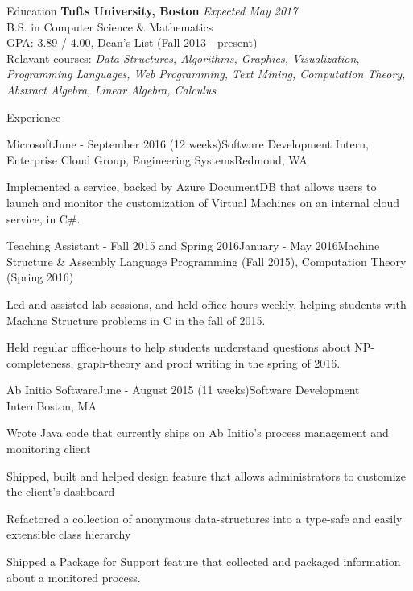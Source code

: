 \documentclass{resume}
\begin{document}
  \begin{rSection}{Education}
    {\bf Tufts University, Boston} \hfill {\em Expected May 2017} \\ 
    { B.S. in Computer Science \& Mathematics } \\
    GPA: 3.89 / 4.00, Dean's List (Fall 2013 - present)\\
    Relavant courses: 
    \textit{Data Structures, Algorithms, Graphics, Visualization, Programming Languages, Web Programming, Text Mining, Computation Theory, Abstract Algebra, Linear Algebra, Calculus}
  \end{rSection}
  
  \begin{rSection}{Experience}
  
    \begin{rSubsection}{Microsoft}{June - September 2016 (12 weeks)}{Software Development Intern, Enterprise Cloud Group, Engineering Systems}{Redmond, WA}
    \item Implemented a service, backed by Azure DocumentDB that allows users to launch and monitor the customization of Virtual Machines on an internal cloud service, in C\#.
    \end{rSubsection}

    \begin{rSubsection}{Teaching Assistant - Fall 2015 and Spring 2016}{January - May 2016}{Machine Structure \& Assembly Language Programming (Fall 2015), Computation Theory (Spring 2016)}{}
    \item Led and assisted lab sessions, and held office-hours weekly, helping students with Machine Structure problems in C in the fall of 2015.
    \item Held regular office-hours to help students understand questions about NP-completeness, graph-theory and proof writing in the spring of 2016.
    \end{rSubsection}
  
    \begin{rSubsection}{Ab Initio Software}{June - August 2015 (11 weeks)}{Software Development Intern}{Boston, MA}
    \item Wrote Java code that currently ships on Ab Initio's process management and monitoring client
    \item Shipped, built and helped design feature that allows administrators to customize the client’s dashboard
    \item Refactored a collection of anonymous data-structures into a type-safe and easily extensible class hierarchy
    \item Shipped a Package for Support feature that collected and packaged information about a monitored process.
    \end{rSubsection}


\end{rSection}
\end{document}
